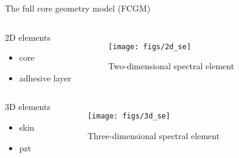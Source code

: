 \documentclass[10pt]{beamer} %
\begin{document}
\begin{frame}[label=frame8]{The full core geometry model (FCGM)}

	\begin{columns}[T]


		\begin{block}{2D elements}

		\begin{itemize}

			\item core

			\item adhesive layer

		\end{itemize}

		\end{block}


		\begin{figure}

			\texttt{[image: figs/2d\_se]}

			\caption{Two-dimensional spectral element}

			\label{fig:2dse}

		\end{figure}

	\end{columns}

	\begin{columns}[T]

		\column{0.5\textwidth}

		\begin{block}{3D elements}

			\begin{itemize}

				\item skin

				\item pzt

			\end{itemize}

		\end{block}

		\column{0.5\textwidth}

		\begin{figure}

			\centering

			\texttt{[image: figs/3d\_se]}

			\caption{Three-dimensional spectral element}

			\label{fig:3dse}

		\end{figure}

	\end{columns}

\end{frame}
\end{document}
